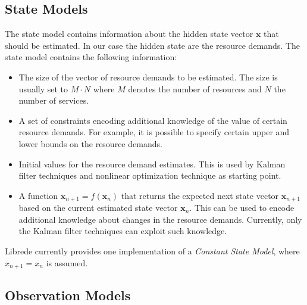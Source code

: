 \subsection{State Models}
The state model contains information about the hidden state vector $\mathbf{x}$ that should be estimated. In our case the hidden state are the resource demands. The state model contains the following information:
\begin{itemize}
\item The size of the vector of resource demands to be estimated. The size is usually set to $M \cdot N$ where $M$ denotes the number of resources and $N$ the number of services.
\item A set of constraints encoding additional knowledge of the value of certain resource demands. For example, it is possible to specify certain upper and lower bounds on the resource demands.
\item Initial values for the resource demand estimates. This is used by Kalman filter techniques and nonlinear optimization technique as starting point.
\item A function $\mathbf{x}_{n+1} = f(\mathbf{x}_n)$ that returns the expected next state vector $\mathbf{x}_{n+1}$ based on the current estimated state vector $\mathbf{x}_n$. This can be used to encode additional knowledge about changes in the resource demands. Currently, only the Kalman filter techniques can exploit such knowledge.
\end{itemize}

Librede currently provides one implementation of a \emph{Constant State Model}, where $x_{n+1}=x_n$ is assumed.

\subsection{Observation Models}

